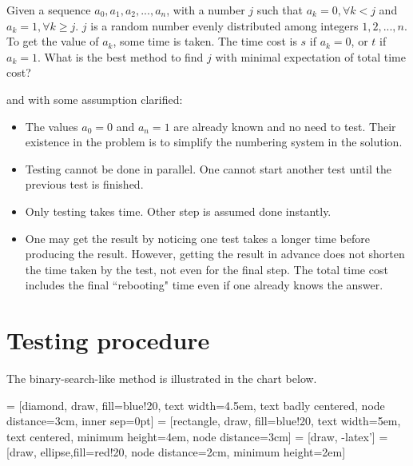 \documentclass[]{article}
\begin{document}
\begin{problem}
	Given a sequence $a_0, a_1, a_2, ..., a_n$, with a number $j$ such that $a_k = 0, \forall k < j$ and $a_k = 1, \forall k \ge j$. $j$ is a random number evenly distributed among integers $1, 2, ..., n$. To get the value of $a_k$, some time is taken. The time cost is $s$ if $a_k = 0$, or $t$ if $a_k = 1$. What is the best method to find $j$ with minimal expectation of total time cost?
\end{problem}

and with some assumption clarified:
\begin{itemize}
	\item The values $a_0 = 0$ and $a_n = 1$ are already known and no need to test. Their existence in the problem is to simplify the numbering system in the solution.
	\item Testing cannot be done in parallel. One cannot start another test until the previous test is finished.
	\item Only testing takes time. Other step is assumed done instantly.
	\item One may get the result by noticing one test takes a longer time before producing the result. However, getting the result in advance does not shorten the time taken by the test, not even for the final step. The total time cost includes the final ``rebooting" time even if one already knows the answer.
\end{itemize}

\section{Testing procedure}

The binary-search-like method is illustrated in the chart below.

 = [diamond, draw, fill=blue!20,
text width=4.5em, text badly centered, node distance=3cm, inner sep=0pt]
 = [rectangle, draw, fill=blue!20,
text width=5em, text centered, minimum height=4em, node distance=3cm]
 = [draw, -latex']
 = [draw, ellipse,fill=red!20, node distance=2cm,
minimum height=2em]
\end{document}
